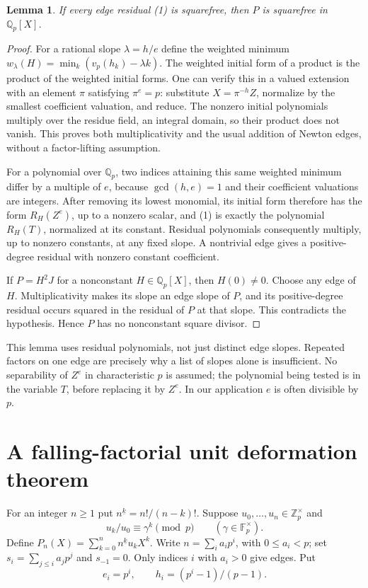 \documentclass[11pt]{article}
\newtheorem{lemma}[theorem]{Lemma}
\newcommand{\Q}{\mathbb Q}
\newcommand{\F}{\mathbb F}
\newcommand{\Z}{\mathbb Z}
\newcommand{\vp}{v_p}
\begin{document}
\begin{lemma}\label{lem:residual}
If every edge residual (1) is squarefree, then $P$ is squarefree in
$\Q_p[X]$.
\end{lemma}
\begin{proof}
For a rational slope $\lambda=h/e$ define the weighted minimum
$w_\lambda(H)=\min_k(\vp(h_k)-\lambda k)$.
The weighted initial form of a product is the product of the weighted
initial forms. One can verify this in a valued extension with an element
$\pi$ satisfying $\pi^e=p$: substitute $X=\pi^{-h}Z$, normalize by the
smallest coefficient valuation, and reduce. The nonzero initial
polynomials multiply over the residue field, an integral domain, so their
product does not vanish. This proves both multiplicativity and the usual
addition of Newton edges, without a factor-lifting assumption.

For a polynomial over $\Q_p$, two indices attaining this same weighted
minimum differ by a multiple of $e$, because $\gcd(h,e)=1$ and their
coefficient valuations are integers. After removing its lowest monomial,
its initial form therefore has the form $R_H(Z^e)$, up to a nonzero scalar,
and (1) is exactly the polynomial $R_H(T)$, normalized at its constant.
Residual polynomials consequently multiply, up to nonzero constants, at
any fixed slope. A nontrivial edge gives a positive-degree residual with
nonzero constant coefficient.

If $P=H^2J$ for a nonconstant $H\in\Q_p[X]$, then $H(0)\ne0$.
Choose any edge of $H$. Multiplicativity makes its slope an edge slope of
$P$, and its positive-degree residual occurs squared in the residual of
$P$ at that slope. This contradicts the hypothesis. Hence $P$ has no
nonconstant square divisor.
\end{proof}

This lemma uses residual polynomials, not just distinct edge slopes.
Repeated factors on one edge are precisely why a list of slopes alone is
insufficient. No separability of $Z^e$ in characteristic $p$ is assumed;
the polynomial being tested is in the variable $T$, before replacing it
by $Z^e$. In our application $e$ is often divisible by $p$.

\section{A falling-factorial unit deformation theorem}
For an integer $n\ge1$ put $n^{\underline k}=n!/(n-k)!$.
Suppose $u_0,\ldots,u_n\in\Z_p^\times$ and
\[
 u_k/u_0\equiv\gamma^k\pmod p
 \qquad(\gamma\in\F_p^\times).
\]
Define $P_n(X)=\sum_{k=0}^n n^{\underline k}u_kX^k$.
Write $n=\sum_i a_i p^i$, with $0\le a_i<p$; set
$s_i=\sum_{j\le i}a_jp^j$ and $s_{-1}=0$.
Only indices $i$ with $a_i>0$ give edges. Put
\[
 e_i=p^i,\qquad h_i=(p^i-1)/(p-1).
\]
\end{document}
